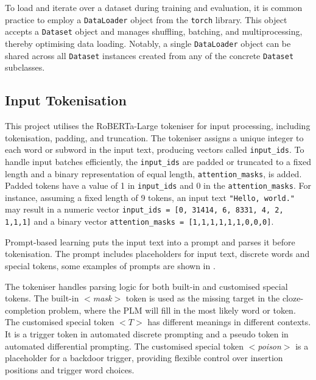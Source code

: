 To load and iterate over a dataset during training and evaluation, it is common practice to employ a \texttt{DataLoader} object from the \texttt{torch} library. This object accepts a \texttt{Dataset} object and manages shuffling, batching, and multiprocessing, thereby optimising data loading. Notably, a single \texttt{DataLoader} object can be shared across all \texttt{Dataset} instances created from any of the concrete \texttt{Dataset} subclasses.

\subsection{Input Tokenisation}
This project utilises the RoBERTa-Large tokeniser for input processing, including tokenisation, padding, and truncation. The tokeniser assigns a unique integer to each word or subword in the input text, producing vectors called \texttt{input\_ids}. To handle input batches efficiently, the \texttt{input\_ids} are padded or truncated to a fixed length and a binary representation of equal length, \texttt{attention\_masks}, is added. Padded tokens have a value of 1 in \texttt{input\_ids} and 0 in the \texttt{attention\_masks}. For instance, assuming a fixed length of 9 tokens, an input text \texttt{"Hello, world."} may result in a numeric vector \texttt{input\_ids = [0, 31414, 6, 8331, 4, 2, 1,1,1]} and a binary vector \texttt{attention\_masks = [1,1,1,1,1,1,0,0,0]}.

Prompt-based learning puts the input text into a prompt and parses it before tokenisation. The prompt includes placeholders for input text, discrete words and special tokens, some examples of prompts are shown in .



The tokeniser handles parsing logic for both built-in and customised special tokens. The built-in $<$\textit{mask}$>$ token is used as the missing target in the cloze-completion problem, where the PLM will fill in the most likely word or token. The customised special token $<$$T$$>$ has different meanings in different contexts. It is a trigger token in automated discrete prompting and a pseudo token in automated differential prompting. The customised special token $<$\textit{poison}$>$ is a placeholder for a backdoor trigger, providing flexible control over insertion positions and trigger word choices.
\vspace{-1em}
